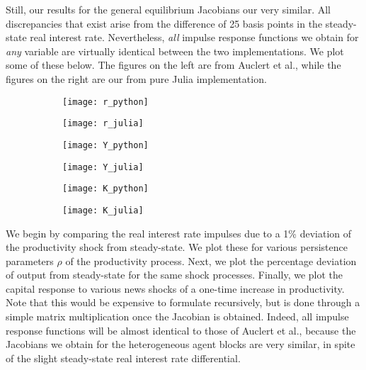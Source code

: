 \documentclass[10pt]{article} %
\begin{document}
Still, our results for the general equilibrium Jacobians our very similar. All discrepancies that exist arise from the difference of 25 basis points in the steady-state real interest rate. Nevertheless, \emph{all} impulse response functions we obtain for \emph{any} variable are virtually identical between the two implementations. We plot some of these below. The figures on the left are from Auclert et al., while the figures on the right are our from pure Julia implementation.

\begin{figure}[t]
\begin{subfigure}[h]{.5 \textwidth}
\centering
\texttt{[image: r\_python]}
\end{subfigure}
\begin{subfigure}[h]{.5 \textwidth}
\centering
\texttt{[image: r\_julia]}
\end{subfigure}

\begin{subfigure}[h]{.5 \textwidth}
\centering
\texttt{[image: Y\_python]}
\end{subfigure}
\begin{subfigure}[h]{.5 \textwidth}
\centering
\texttt{[image: Y\_julia]}
\end{subfigure}

\begin{subfigure}[h]{.5 \textwidth}
\centering
\texttt{[image: K\_python]}
\end{subfigure}
\begin{subfigure}[h]{.5 \textwidth}
\centering
\texttt{[image: K\_julia]}
\end{subfigure}
\end{figure}


We begin by comparing the real interest rate impulses due to a 1\% deviation of the productivity shock from steady-state. We plot these for various persistence parameters $\rho$ of the productivity process. Next, we plot the percentage deviation of output from steady-state for the same shock processes. Finally, we plot the capital response to various news shocks of a one-time increase in productivity. Note that this would be expensive to formulate recursively, but is done through a simple matrix multiplication once the Jacobian is obtained. Indeed, all impulse response functions will be almost identical to those of Auclert et al., because the Jacobians we obtain for the heterogeneous agent blocks are very similar, in spite of the slight steady-state real interest rate differential.
\end{document}
